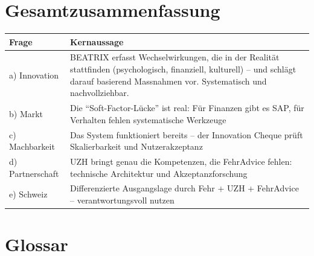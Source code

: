 \documentclass[11pt,a4paper]{article}
\begin{document}
\section*{Gesamtzusammenfassung}

\begin{table}[h]
\centering
\begin{tabular}{@{}L{3cm}L{10cm}@{}}
\toprule
\textbf{Frage} & \textbf{Kernaussage} \\
\midrule
a) Innovation & BEATRIX erfasst Wechselwirkungen, die in der Realität stattfinden (psychologisch, finanziell, kulturell) -- und schlägt darauf basierend Massnahmen vor. Systematisch und nachvollziehbar. \\
b) Markt & Die ``Soft-Factor-Lücke'' ist real: Für Finanzen gibt es SAP, für Verhalten fehlen systematische Werkzeuge \\
c) Machbarkeit & Das System funktioniert bereits -- der Innovation Cheque prüft Skalierbarkeit und Nutzerakzeptanz \\
d) Partnerschaft & UZH bringt genau die Kompetenzen, die FehrAdvice fehlen: technische Architektur und Akzeptanzforschung \\
e) Schweiz & Differenzierte Ausgangslage durch Fehr + UZH + FehrAdvice -- verantwortungsvoll nutzen \\
\bottomrule
\end{tabular}
\end{table}

\vspace{1cm}

\begin{center}
\end{center}

\newpage


\section*{Glossar}
\end{document}
